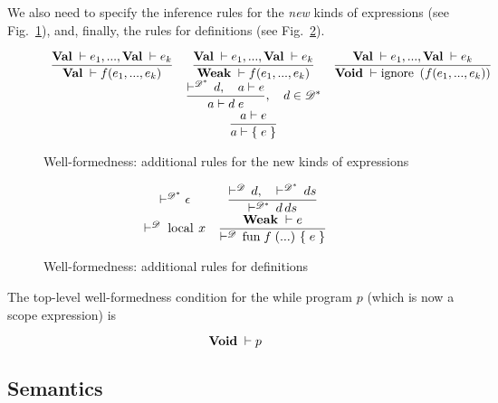\documentclass{article}
\newcommand{\trule}[2]{\dfrac{#1}{#2}}
\newcommand{\withenv}[2]{{#1}\vdash{#2}}
\newcommand{\llang}[1]{\mbox{\lstinline[mathescape]|#1|}}
\theoremstyle{definition}
\begin{document}
We also need to specify the inference rules for the \emph{new} kinds of expressions (see Fig.~\ref{well_formed_new}), 
and, finally, the rules for definitions (see Fig.~\ref{well_formed_def}).


\begin{figure}[h]
\renewcommand{\arraystretch}{2}
\[
  \begin{array}{ccc}
  \trule{\withenv{\Val}{e_1},...,\withenv{\Val}{e_k}} 
        {\withenv{\Val}{f (e_1,...,e_k)}} &   \trule{\withenv{\Val}{e_1},...,\withenv{\Val}{e_k}} 
                                                    {\withenv{\Weak}{f (e_1,...,e_k)}} & \trule{\withenv{\Val}{e_1},...,\withenv{\Val}{e_k}} 
                                                    {\withenv{\Void}{\llang{ignore ($f (e_1,...,e_k)$)}}} \\[2mm]
                                         & \trule{\vdash^{\mathscr D^*}\,d,\quad \withenv{a}{e}}
                                                    {\withenv{a}{d\;e}},\quad d\in\mathscr D^* & \\[2mm]
                                         & \trule{\withenv{a}{e}}
                                                    {\withenv{a}{\llang{\{$\;e\;$\}}}} &                                                     
  \end{array}
  \]
  \caption{Well-formedness: additional rules for the new kinds of expressions}
  \label{well_formed_new}  
\end{figure}

\begin{figure}[h]
\renewcommand{\arraystretch}{2}
\[
   \begin{array}{cc}
    \vdash^{\mathscr D^*}{\epsilon} & \trule{\vdash^{\mathscr D}\,d,\quad \vdash^{\mathscr D^*}\,ds}{\vdash^{\mathscr D^*}\,{d\,ds}} \\[2mm]
    \vdash^{\mathscr D}\,\llang{local $\;x$} & \trule{\withenv{\Weak}{e}}
                                                   {\vdash^{\mathscr D}\,\llang{fun $\;f\;$ (...) \{$\;e\;$\}}}
  \end{array}
  \]
  \caption{Well-formedness: additional rules for definitions}
  \label{well_formed_def}  
\end{figure}


The top-level well-formedness condition for the while program $p$ (which is now a scope expression) is

\[
\withenv{\Void}{p}
\]

\subsection{Semantics}
\end{document}
